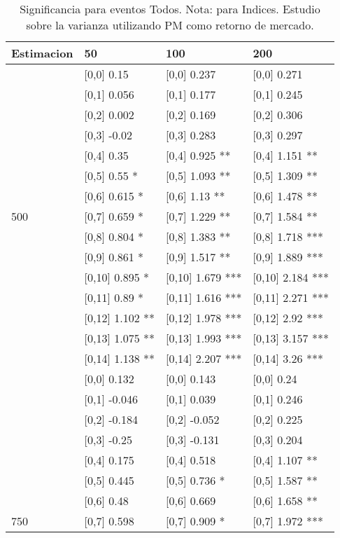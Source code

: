 \begin{table}

\caption{Significancia para eventos Todos. Nota: para Indices. Estudio sobre la varianza utilizando PM como retorno de mercado.}
\centering
\begin{tabular}[t]{llll}
\toprule
Estimacion & 50 & 100 & 200\\
\midrule
 & {}[0,0] 0.15 & {}[0,0] 0.237 & {}[0,0] 0.271\\
 & {}[0,1] 0.056 & {}[0,1] 0.177 & {}[0,1] 0.245\\
 & {}[0,2] 0.002 & {}[0,2] 0.169 & {}[0,2] 0.306\\
 & {}[0,3] -0.02 & {}[0,3] 0.283 & {}[0,3] 0.297\\
 & {}[0,4] 0.35 & {}[0,4] 0.925 ** & {}[0,4] 1.151 **\\
\addlinespace
 & {}[0,5] 0.55 * & {}[0,5] 1.093 ** & {}[0,5] 1.309 **\\
 & {}[0,6] 0.615 * & {}[0,6] 1.13 ** & {}[0,6] 1.478 **\\
500 & {}[0,7] 0.659 * & {}[0,7] 1.229 ** & {}[0,7] 1.584 **\\
 & {}[0,8] 0.804 * & {}[0,8] 1.383 ** & {}[0,8] 1.718 ***\\
 & {}[0,9] 0.861 * & {}[0,9] 1.517 ** & {}[0,9] 1.889 ***\\
\addlinespace
 & {}[0,10] 0.895 * & {}[0,10] 1.679 *** & {}[0,10] 2.184 ***\\
 & {}[0,11] 0.89 * & {}[0,11] 1.616 *** & {}[0,11] 2.271 ***\\
 & {}[0,12] 1.102 ** & {}[0,12] 1.978 *** & {}[0,12] 2.92 ***\\
 & {}[0,13] 1.075 ** & {}[0,13] 1.993 *** & {}[0,13] 3.157 ***\\
 & {}[0,14] 1.138 ** & {}[0,14] 2.207 *** & {}[0,14] 3.26 ***\\
\addlinespace
 & {}[0,0] 0.132 & {}[0,0] 0.143 & {}[0,0] 0.24\\
 & {}[0,1] -0.046 & {}[0,1] 0.039 & {}[0,1] 0.246\\
 & {}[0,2] -0.184 & {}[0,2] -0.052 & {}[0,2] 0.225\\
 & {}[0,3] -0.25 & {}[0,3] -0.131 & {}[0,3] 0.204\\
 & {}[0,4] 0.175 & {}[0,4] 0.518 & {}[0,4] 1.107 **\\
\addlinespace
 & {}[0,5] 0.445 & {}[0,5] 0.736 * & {}[0,5] 1.587 **\\
 & {}[0,6] 0.48 & {}[0,6] 0.669 & {}[0,6] 1.658 **\\
750 & {}[0,7] 0.598 & {}[0,7] 0.909 * & {}[0,7] 1.972 ***\\

\end{tabular}
\end{table}
